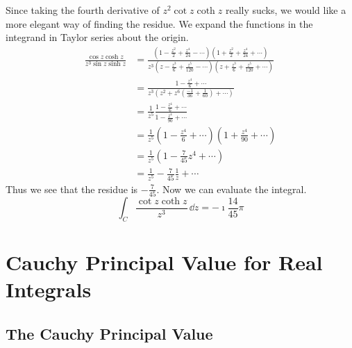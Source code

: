 \begin{Example}
  Since taking the fourth derivative of $z^2 \cot z  \coth z$ really sucks, we
  would like a more elegant way of finding the residue.  We expand the
  functions in the integrand in Taylor series about the origin.
  \begin{align*}
    \frac{\cos z \cosh z}{z^3 \sin z  \sinh z}
    &= \frac{\left( 1 - \frac{z^2}{2} + \frac{z^4}{24} - \cdots \right)
      \left(1 + \frac{z^2}{2} + \frac{z^4}{24} + \cdots \right)}{z^3
      \left(z - \frac{z^3}{6} + \frac{z^5}{120} - \cdots \right)
      \left(z + \frac{z^3}{6} + \frac{z^5}{120} + \cdots \right)} \\
    &= \frac{1 - \frac{z^4}{6} + \cdots }
    {z^3 \left(z^2 + z^6 \left( \frac{-1}{36} + \frac{1}{60}
        \right)  + \cdots \right) } \\
    &= \frac{1}{z^5} \frac{1 - \frac{z^4}{6} + \cdots }
    {1 - \frac{z^4}{90} + \cdots } \\
    &= \frac{1}{z^5} \left( 1 - \frac{z^4}{6} + \cdots  \right)
    \left( 1 + \frac{z^4}{90} + \cdots  \right) \\
    &= \frac{1}{z^5} \left(1 - \frac{7}{45} z^4 + \cdots \right) \\
    &= \frac{1}{z^5} -\frac{7}{45} \frac{1}{z} + \cdots
  \end{align*}
  Thus we see that the residue is $-\frac{7}{45}$.
  Now we can evaluate the integral.
  \[
  \int_C \frac{\cot z  \coth z}{z^3} \,\dd z = - \imath \frac{14}{45} \pi
  \]
\end{Example}
















\section{Cauchy Principal Value for Real Integrals}











\subsection{The Cauchy Principal Value}



